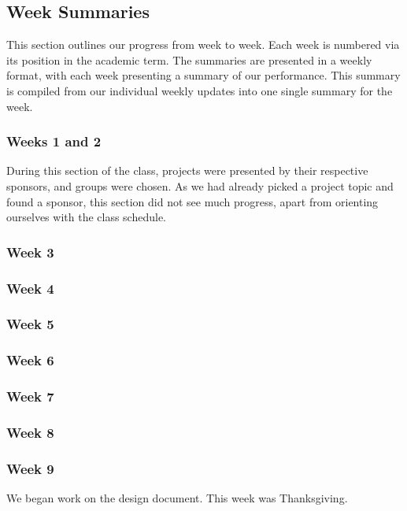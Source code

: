 \documentclass[draftclsnofoot,onecolumn,letterpaper,10pt]{IEEEtran}
\begin{document}
\subsection{Week Summaries}\label{sec:weekSummaries}
This section outlines our progress from week to week.
Each week is numbered via its position in the academic term.
The summaries are presented in a weekly format, with each week presenting a summary of our performance.
This summary is compiled from our individual weekly updates into one single summary for the week. %

\subsubsection{Weeks 1 and 2}
During this section of the class, projects were presented by their respective sponsors, and groups were chosen.
As we had already picked a project topic and found a sponsor, this section did not see much progress, apart from orienting ourselves with the class schedule.

\subsubsection{Week 3} %

\subsubsection{Week 4} %

\subsubsection{Week 5} %

\subsubsection{Week 6}

\subsubsection{Week 7}

\subsubsection{Week 8}

\subsubsection{Week 9} %
We began work on the design document. This week was Thanksgiving.
\end{document}
